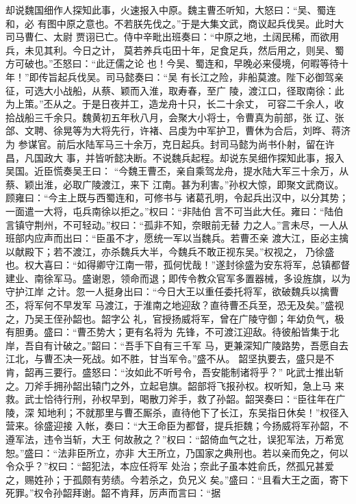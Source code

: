 却说魏国细作人探知此事，火速报入中原。魏主曹丕听知，大怒曰：“吴、蜀连和，必
有图中原之意也。不若朕先伐之。”于是大集文武，商议起兵伐吴。此时大司马曹仁、太尉
贾诩已亡。侍中辛毗出班奏曰：“中原之地，土阔民稀，而欲用兵，未见其利。今日之计，
莫若养兵屯田十年，足食足兵，然后用之，则吴、蜀方可破也。”丕怒曰：“此迂儒之论
也！今吴、蜀连和，早晚必来侵境，何暇等待十年！”即传旨起兵伐吴。司马懿奏曰：“吴
有长江之险，非船莫渡。陛下必御驾亲征，可选大小战船，从蔡、颖而入淮，取寿春，至广
陵，渡江口，径取南徐：此为上策。”丕从之。于是日夜并工，造龙舟十只，长二十余丈，
可容二千余人，收拾战船三千余只。魏黄初五年秋八月，会聚大小将士，令曹真为前部，张
辽、张郃、文聘、徐晃等为大将先行，许褚、吕虔为中军护卫，曹休为合后，刘晔、蒋济为
参谋官。前后水陆军马三十余万，克日起兵。封司马懿为尚书仆射，留在许昌，凡国政大
事，并皆听懿决断。不说魏兵起程。却说东吴细作探知此事，报入吴国。近臣慌奏吴王曰：
“今魏王曹丕，亲自乘驾龙舟，提水陆大军三十余万，从蔡、颖出淮，必取广陵渡江，来下
江南。甚为利害。”孙权大惊，即聚文武商议。顾雍曰：“今主上既与西蜀连和，可修书与
诸葛孔明，令起兵出汉中，以分其势；一面遣一大将，屯兵南徐以拒之。”权曰：“非陆伯
言不可当此大任。雍曰：“陆伯言镇守荆州，不可轻动。”权曰：“孤非不知，奈眼前无替
力之人。”言未尽，一人从班部内应声而出曰：“臣虽不才，愿统一军以当魏兵。若曹丕亲
渡大江，臣必主擒以献殿下；若不渡江，亦杀魏兵大半，今魏兵不敢正视东吴。”权视之，
乃徐盛也。权大喜曰：“如得卿守江南一带，孤何忧哉！”遂封徐盛为安东将军，总镇都督
建业、南徐军马。盛谢恩，领命而退；即传令教众官军多置器械，多设旌旗，以为守护江岸
之计。忽一人挺身出曰：“今日大王以重任委托将军，欲破魏兵以擒曹丕，将军何不早发军
马渡江，于淮南之地迎敌？直待曹丕兵至，恐无及矣。”盛视之，乃吴王侄孙韶也。韶字公
礼，官授扬威将军，曾在广陵守御；年幼负气，极有胆勇。盛曰：“曹丕势大；更有名将为
先锋，不可渡江迎敌。待彼船皆集于北岸，吾自有计破之。”韶曰：“吾手下自有三千军
马，更兼深知广陵路势，吾愿自去江北，与曹丕决一死战。如不胜，甘当军令。”盛不从。
韶坚执要去，盛只是不肯，韶再三要行。盛怒曰：“汝如此不听号令，吾安能制诸将乎？”
叱武士推出斩之。刀斧手拥孙韶出辕门之外，立起皂旗。韶部将飞报孙权。权听知，急上马
来救。武士恰待行刑，孙权早到，喝散刀斧手，救了孙韶。韶哭奏曰：“臣往年在广陵，深
知地利；不就那里与曹丕厮杀，直待他下了长江，东吴指日休矣！”权径入营来。徐盛迎接
入帐，奏曰：“大王命臣为都督，提兵拒魏；今扬威将军孙韶，不遵军法，违令当斩，大王
何故赦之？”权曰：“韶倚血气之壮，误犯军法，万希宽恕。”盛曰：“法非臣所立，亦非
大王所立，乃国家之典刑也。若以亲而免之，何以令众乎？”权曰：“韶犯法，本应任将军
处治；奈此子虽本姓俞氏，然孤兄甚爱之，赐姓孙；于孤颇有劳绩。今若杀之，负兄义
矣。”盛曰：“且看大王之面，寄下死罪。”权令孙韶拜谢。韶不肯拜，厉声而言曰：“据
